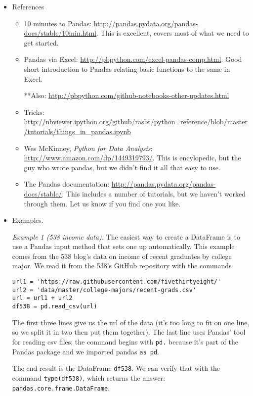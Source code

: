 \documentclass[11pt]{article}
\begin{document}
\begin{itemize}
\item References
\begin{itemize}
\item 10 minutes to Pandas:  \url{http://pandas.pydata.org/pandas-docs/stable/10min.html}.
This is excellent, covers most of what we need to get started.

\item Pandas via Excel:  \url{http://pbpython.com/excel-pandas-comp.html}.
Good short introduction to Pandas relating basic functions to the same in Excel.

**Also:  \url{http://pbpython.com/github-notebooks-other-updates.html} 

\item Tricks:  \url{http://nbviewer.ipython.org/github/rasbt/python_reference/blob/master/tutorials/things_in_pandas.ipynb}

\item Wes McKinney, {\it Python for Data Analysis\/}: \url{http://www.amazon.com/dp/1449319793/}.
This is encylopedic, but the guy who wrote pandas, but we didn't find it all that easy
to use.

\item The Pandas documentation:  \url{http://pandas.pydata.org/pandas-docs/stable/}.
This includes a number of tutorials, but we haven't worked through them.
Let us know if you find one you like.
\end{itemize}

\item Examples.

{\it Example 1 (538 income data).\/}
The easiest way to create a DataFrame is to use a Pandas input method
that sets one up automatically.
This example comes from the 538 blog's data on income of recent graduates by
college major.
We read it from the 538's GitHub repository with the commands
\begin{verbatim}
url1 = 'https://raw.githubusercontent.com/fivethirtyeight/'
url2 = 'data/master/college-majors/recent-grads.csv'
url = url1 + url2
df538 = pd.read_csv(url)
\end{verbatim}
The first three lines give us the url of the data
(it's too long to fit on one line, so we split it in two
then put them together).
The last line uses Pandas' tool for reading csv files;
the command begins with {\tt pd.} because it's part of the Pandas
package and we imported pandas {\tt as pd}.

The end result is the DataFrame {\tt df538}.
We can verify that with the command {\tt type(df538)},
which returns the answer:  {\tt pandas.core.frame.DataFrame}.


\end{itemize}
\end{document}
